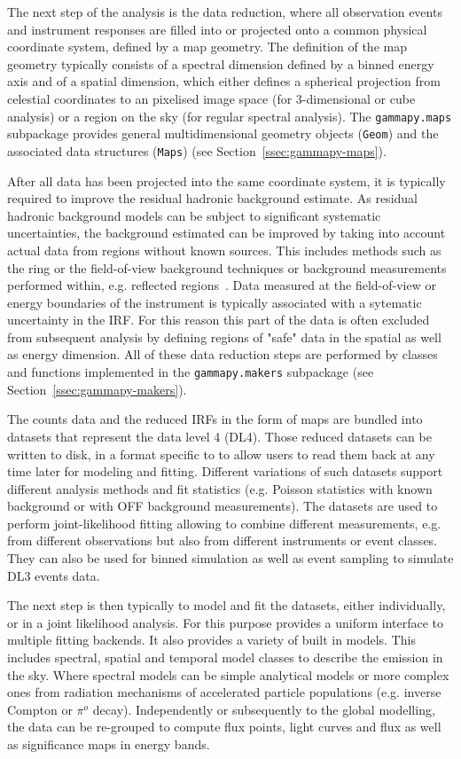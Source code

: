 \documentclass[traditabstract, longauth]{aa}
\newcommand{\code}[1]{\texttt{#1}}
\begin{document}
The next step of the analysis is the data reduction, where all observation events and instrument
responses are filled into or projected onto a common physical coordinate system, defined by
a map geometry. The definition of the map geometry typically consists of a spectral dimension
defined by a binned energy axis and of a spatial dimension, which either defines 
a spherical projection from celestial coordinates to an pixelised image space
(for 3-dimensional or cube analysis) or a region on the sky (for regular spectral analysis).
The \code{gammapy.maps} subpackage provides general multidimensional geometry objects
(\code{Geom}) and the associated data structures (\code{Maps}) (see Section~\ref{ssec:gammapy-maps}).

After all data has been projected into the same coordinate system, it is typically
required to improve the residual hadronic background estimate. As residual hadronic
background models can be subject to significant systematic uncertainties,
the background estimated can be improved by taking into account actual data
from regions without known \gammaray sources. This includes methods 
such as the ring or the field-of-view background techniques or
background measurements performed within, e.g. reflected regions~\citep{Berge07}.
Data measured at the field-of-view or energy boundaries of the instrument is typically
associated with a sytematic uncertainty in the IRF. For this reason this part 
of the data is often excluded from subsequent analysis by defining regions of
 "safe" data in the spatial as well as energy dimension.
All of these data reduction steps are performed by classes and functions
implemented in the \code{gammapy.makers} subpackage (see Section~\ref{ssec:gammapy-makers}).

The counts data and the reduced IRFs in the form of maps are bundled into datasets
that represent the data level 4 (DL4). Those reduced datasets can be written to disk,
in a format specific to \gammapy to allow users to read them back at any time later
for modeling and fitting. Different variations of such datasets support different 
analysis methods and fit statistics (e.g. Poisson statistics with known background or
with OFF background measurements). The datasets are used to perform joint-likelihood
fitting allowing to combine different measurements, e.g. from different observations
but also from different instruments or event classes. They can also be used for binned
simulation as well as event sampling to simulate DL3 events data.

The next step is then typically to model and fit the datasets, either
individually, or in a joint likelihood analysis. For this purpose \gammapy
provides a uniform interface to multiple fitting backends. It also provides
a variety of built in models. This includes spectral,
spatial and temporal model classes to describe the \gammaray emission in the sky.
Where spectral models can be simple analytical models or more complex ones from radiation
mechanisms of accelerated particle populations (e.g. inverse Compton or $\pi^{o}$ decay).
Independently or subsequently to the global modelling, the data can be
re-grouped to compute flux points, light curves and flux as well as significance
maps in energy bands.
\end{document}
